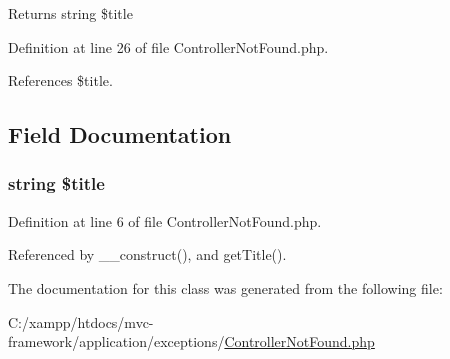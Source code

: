 \begin{DoxyReturn}{Returns}
string \$title 
\end{DoxyReturn}


Definition at line 26 of file Controller\+Not\+Found.\+php.



References \$title.




\subsection{Field Documentation}
\hypertarget{class_controller_not_found_a5ef02115477cfad473df2455da5a908e}{}
\subsubsection[{\$title}]{\setlength{\rightskip}{0pt plus 5cm}string \$title\hspace{0.3cm}{\ttfamily [protected]}}\label{class_controller_not_found_a5ef02115477cfad473df2455da5a908e}


Definition at line 6 of file Controller\+Not\+Found.\+php.



Referenced by \+\_\+\+\_\+construct(), and get\+Title().



The documentation for this class was generated from the following file\+:\begin{DoxyCompactItemize}
\item 
C\+:/xampp/htdocs/mvc-\/framework/application/exceptions/\hyperlink{_controller_not_found_8php}{Controller\+Not\+Found.\+php}\end{DoxyCompactItemize}

